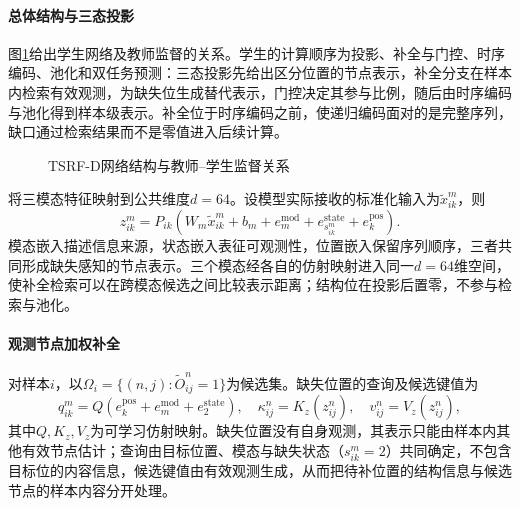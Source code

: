 \paragraph{总体结构与三态投影}
图\ref{q2:fig:arch}给出学生网络及教师监督的关系。学生的计算顺序为投影、补全与门控、时序编码、池化和双任务预测：三态投影先给出区分位置的节点表示，补全分支在样本内检索有效观测，为缺失位生成替代表示，门控决定其参与比例，随后由时序编码与池化得到样本级表示。补全位于时序编码之前，使递归编码面对的是完整序列，缺口通过检索结果而不是零值进入后续计算。
\begin{figure}[htbp]\centering
{}
\caption{TSRF-D网络结构与教师--学生监督关系}\label{q2:fig:arch}
\end{figure}

将三模态特征映射到公共维度$d=64$。设模型实际接收的标准化输入为$\widetilde x^m_{ik}$，则
\begin{equation}
z^m_{ik}=P_{ik}\left(W_m\widetilde x^m_{ik}+b_m+
e_m^{\mathrm{mod}}+e_{s^m_{ik}}^{\mathrm{state}}+e_k^{\mathrm{pos}}\right).
\end{equation}
模态嵌入描述信息来源，状态嵌入表征可观测性，位置嵌入保留序列顺序，三者共同形成缺失感知的节点表示。三个模态经各自的仿射映射进入同一$d=64$维空间，使补全检索可以在跨模态候选之间比较表示距离；结构位在投影后置零，不参与检索与池化。

\paragraph{观测节点加权补全}
对样本$i$，以$\Omega_i=\{(n,j):\widetilde O^n_{ij}=1\}$为候选集。缺失位置的查询及候选键值为
\begin{equation}
q^m_{ik}=Q(e_k^{\mathrm{pos}}+e_m^{\mathrm{mod}}+e_2^{\mathrm{state}}),\quad
\kappa^n_{ij}=K_z(z^n_{ij}),\quad v^n_{ij}=V_z(z^n_{ij}),
\end{equation}
其中$Q,K_z,V_z$为可学习仿射映射。缺失位置没有自身观测，其表示只能由样本内其他有效节点估计；查询由目标位置、模态与缺失状态（$s^m_{ik}=2$）共同确定，不包含目标位的内容信息，候选键值由有效观测生成，从而把待补位置的结构信息与候选节点的样本内容分开处理。


